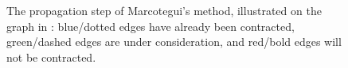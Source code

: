 \documentclass[preprint,a4paper]{elsarticle}
\newenvironment{stusubfig}[1]
{
	\begin{figure}[#1]
	\begin{center}
}
{
	\end{center}
	\end{figure}
}
\begin{document}
\begin{stusubfig}{p}
	\hspace{4mm}%
	\hspace{4mm}%
\caption{The propagation step of Marcotegui's method, illustrated on the graph in \cite{marcotegui05}: blue/dotted edges have already been contracted, green/dashed edges are under consideration, and red/bold edges will not be contracted.}
\label{fig:segmentation-waterfall-marcotegui-propagation}
\end{stusubfig}
\end{document}

